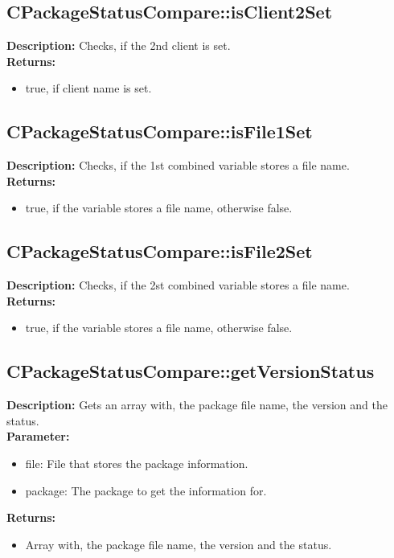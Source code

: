 \subsection{CPackageStatusCompare::isClient2Set}
\textbf{Description:} Checks, if the 2nd client is set.\\
\textbf{Returns:}
\begin{itemize}
\item true, if client name is set.
\end{itemize}

\subsection{CPackageStatusCompare::isFile1Set}
\textbf{Description:} Checks, if the 1st combined variable stores a file name.\\
\textbf{Returns:}
\begin{itemize}
\item true, if the variable stores a file name, otherwise false.
\end{itemize}

\subsection{CPackageStatusCompare::isFile2Set}
\textbf{Description:} Checks, if the 2st combined variable stores a file name.\\
\textbf{Returns:}
\begin{itemize}
\item true, if the variable stores a file name, otherwise false.
\end{itemize}

\subsection{CPackageStatusCompare::getVersionStatus}
\textbf{Description:} Gets an array with, the package file name, the version and the status.\\
\textbf{Parameter:}
\begin{itemize}
\item file: File that stores the package information.
\item package: The package to get the information for.
\end{itemize}
\textbf{Returns:}
\begin{itemize}
\item Array with, the package file name, the version and the status.
\end{itemize}

